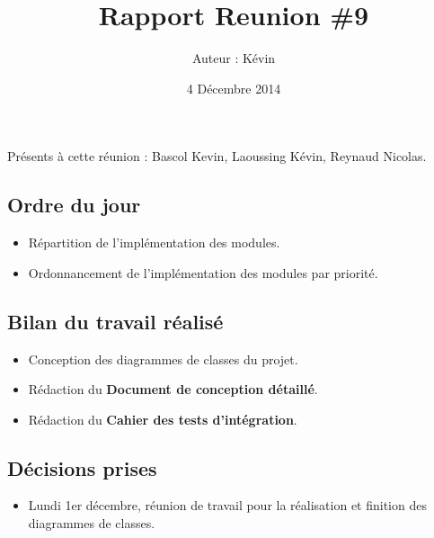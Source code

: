 \documentclass[12pt,a4paper]{article}
\title{Rapport Reunion \#9}
\author{Auteur : Kévin \bsc{LAOUSSING}}
\date{4 Décembre 2014}
\begin{document}
\maketitle

\newpage

Présents à cette réunion : Bascol Kevin, Laoussing Kévin, Reynaud Nicolas.

\subsection*{Ordre du jour}
\begin{itemize}[label = $\blacktriangleright$]
\item Répartition de l'implémentation des modules.
\item Ordonnancement de l'implémentation des modules par priorité. 
\end{itemize}

\subsection*{Bilan du travail réalisé}

\begin{itemize}[label = $\blacktriangleright$]
\item Conception des diagrammes de classes du projet.

\item Rédaction du \textbf{Document de conception détaillé}.

\item Rédaction du \textbf{Cahier des tests d'intégration}.
\end{itemize}


\subsection*{Décisions prises}

\begin{itemize}[label = $\blacktriangleright$]
\item Lundi 1er décembre, réunion de travail pour la réalisation et finition des diagrammes de classes. 
\end{itemize}
\end{document}
